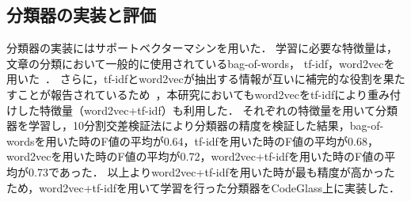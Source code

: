 

\subsection{分類器の実装と評価}

分類器の実装にはサポートベクターマシンを用いた．
学習に必要な特徴量は，文章の分類において一般的に使用されているbag-of-words， tf-idf，word2vecを用いた~\cite{pmlr-v32-le14}．
さらに，tf-idfとword2vecが抽出する情報が互いに補完的な役割を果たすことが報告されているため~\cite{SVM-word2vec-tfidf}，本研究においてもword2vecをtf-idfにより重み付けした特徴量（word2vec+tf-idf）も利用した．
それぞれの特徴量を用いて分類器を学習し，10分割交差検証法により分類器の精度を検証した結果，bag-of-wordsを用いた時のF値の平均が0.64，tf-idfを用いた時のF値の平均が0.68，word2vecを用いた時のF値の平均が0.72，word2vec+tf-idfを用いた時のF値の平均が0.73であった．
以上よりword2vec+tf-idfを用いた時が最も精度が高かったため，word2vec+tf-idfを用いて学習を行った分類器をCodeGlass上に実装した．




